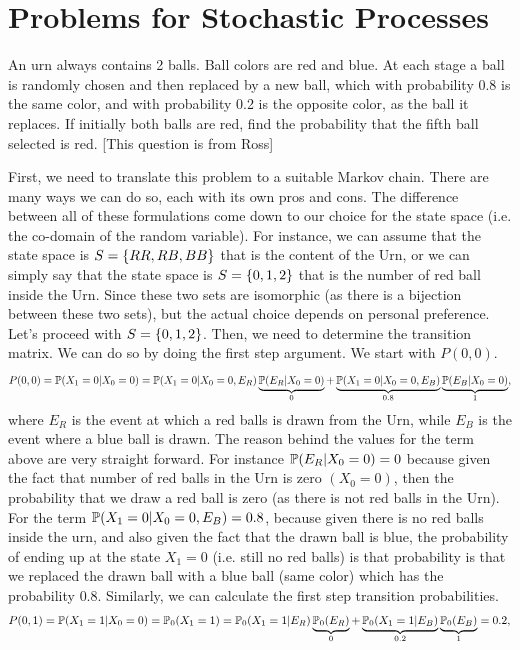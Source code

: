 \section{Problems for Stochastic Processes}
\begin{problem}
	An urn always contains 2 balls. Ball colors are red and blue. At each stage a ball  is randomly chosen and then replaced by a new ball, which with probability 0.8 is the same color, and with probability 0.2 is the opposite color, as the ball it replaces. If initially both balls are red, find the probability that the fifth ball selected is red. [This question is from Ross]
	\begin{solution}
		First, we need to translate this problem to a suitable Markov chain. There are many ways we can do so, each with its own pros and cons. The difference between all of these formulations come down to our choice for the state space (i.e. the co-domain of the random variable). For instance, we can assume that the state space is $S = \{RR, RB, BB\}$ that is the content of the Urn, or we can simply say that the state space is $S = \{0,1,2\}$ that is the number of red ball inside the Urn. Since these two sets are isomorphic (as there is a bijection between these two sets), but the actual choice depends on personal preference. Let's proceed with $S = \{0,1,2\}$. Then, we need to determine the transition matrix. We can do so by doing the first step argument. We start with $P(0,0)$. 
		\[ P(0,0) = \mathbb{P}(X_1 = 0|X_0 =0) = \mathbb{P}(X_1=0|X_0=0,E_R)\underbrace{\mathbb{P}(E_R|X_0=0)}_{0} + \underbrace{\mathbb{P}(X_1=0|X_0=0,E_B)}_{0.8}\underbrace{\mathbb{P}(E_B|X_0=0)}_{1}, \]
		where $E_R$ is the event at which a red balls is drawn from the Urn, while $E_B$ is the event where a blue ball is drawn. The reason behind the values for the term above are very straight forward. For instance $\mathbb{P}(E_R|X_0=0)=0$ because given the fact that number of red balls in the Urn is zero $(X_0 = 0)$, then the probability that we draw a red ball is zero (as there is not red balls in the Urn). For the term $\mathbb{P}(X_1=0|X_0=0,E_B) = 0.8$, because given there is no red balls inside the urn, and also given the fact that the drawn ball is blue, the probability of ending up at the state $X_1=0$ (i.e. still no red balls) is that probability is that we replaced the drawn ball with a blue ball (same color) which has the probability $0.8$. Similarly, we can calculate the first step transition probabilities. 
		\begin{align*}
			&P(0,1) = \prob(X_1=1|X_0=0) = \prob_0(X_1=1) = \prob_0(X_1=1|E_R)\underbrace{\prob_0(E_R)}_{0} + \underbrace{\prob_0(X_1=1|E_B)}_{0.2}\underbrace{\prob_0(E_B)}_{1} = 0.2,\\

\end{align*}
\end{solution}
\end{problem}
